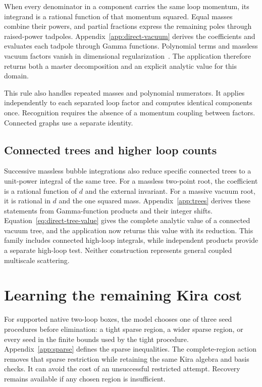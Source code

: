 \documentclass[11pt,a4paper]{article}
\begin{document}
When every denominator in a component carries the same loop momentum, its integrand is a rational function of that momentum squared. Equal masses combine their powers, and partial fractions express the remaining poles through raised-power tadpoles. Appendix~\ref{app:direct-vacuum} derives the coefficients and evaluates each tadpole through Gamma functions. Polynomial terms and massless vacuum factors vanish in dimensional regularization~\cite{Weinzierl2022}. The application therefore returns both a master decomposition and an explicit analytic value for this domain.

This rule also handles repeated masses and polynomial numerators. It applies independently to each separated loop factor and computes identical components once. Recognition requires the absence of a momentum coupling between factors. Connected graphs use a separate identity.

\subsection{Connected trees and higher loop counts}
Successive massless bubble integrations also reduce specific connected trees to a unit-power integral of the same tree. For a massless two-point root, the coefficient is a rational function of $d$ and the external invariant. For a massive vacuum root, it is rational in $d$ and the one squared mass. Appendix~\ref{app:trees} derives these statements from Gamma-function products and their integer shifts. Equation~\eqref{eq:direct-tree-value} gives the complete analytic value of a connected vacuum tree, and the application now returns this value with its reduction. This family includes connected high-loop integrals, while independent products provide a separate high-loop test. Neither construction represents general coupled multiscale scattering.

\section{Learning the remaining Kira cost}
\label{sec:learning}
For supported native two-loop boxes, the model chooses one of three seed procedures before elimination: a tight sparse region, a wider sparse region, or every seed in the finite bounds used by the tight procedure. Appendix~\ref{app:sparse} defines the sparse inequalities. The complete-region action removes that sparse restriction while retaining the same Kira algebra and basis checks. It can avoid the cost of an unsuccessful restricted attempt. Recovery remains available if any chosen region is insufficient.
\end{document}
